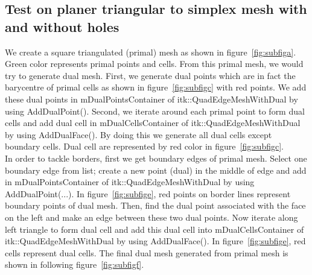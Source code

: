 \documentclass{InsightArticle}
\begin{document}
\subsection{Test on planer triangular to simplex mesh with and without holes}
We create a square triangulated (primal) mesh as shown in figure~\ref{fig:subfiga}. Green color represents primal points and cells. From this primal mesh, we would try to generate dual mesh. First, we generate dual points which are in fact the barycentre of primal cells as shown in figure~\ref{fig:subfigc} with red points. We add these dual points in mDualPointsContainer of itk::QuadEdgeMeshWithDual by using AddDualPoint(). Second, we iterate around each primal point to form dual cells and add dual cell in mDualCellsContainer of itk::QuadEdgeMeshWithDual by using AddDualFace(). By doing this we generate all dual cells except boundary cells. Dual cell are represented by red color in figure~\ref{fig:subfigc}.\\
In order to tackle borders, first we get boundary edges of primal mesh. Select one boundary edge from list; create a new point (dual) in the middle of edge and add in mDualPointsContainer of itk::QuadEdgeMeshWithDual by using AddDualPoint(...).  
In figure~\ref{fig:subfige}, red points on border lines represent boundary points of dual mesh. Then, find the dual point associated with the face on the left and make an edge between these two dual points. Now iterate along left triangle to form dual cell and add this dual cell into mDualCellsContainer of itk::QuadEdgeMeshWithDual by using AddDualFace(). In figure~\ref{fig:subfige}, red cells represent dual cells. The final dual mesh generated from primal mesh is shown in following figure~\ref{fig:subfigf}. 
\end{document}
